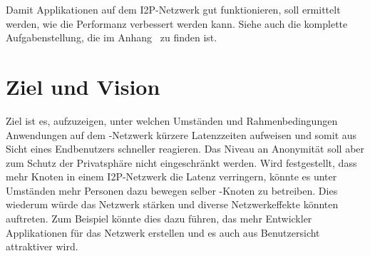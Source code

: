 Damit Applikationen auf dem I2P-Netzwerk gut funktionieren, soll ermittelt werden, wie die Performanz
verbessert werden kann.
Siehe auch die komplette Aufgabenstellung, die im Anhang~ zu finden ist.

\section{Ziel und Vision}\label{sec:ziel}

Ziel ist es, aufzuzeigen, unter welchen Umständen und Rahmenbedingungen Anwendungen auf dem -Netzwerk kürzere Latenzzeiten aufweisen
und somit aus Sicht eines Endbenutzers schneller reagieren.
Das Niveau an Anonymität soll aber zum Schutz der Privatsphäre nicht eingeschränkt werden.
Wird festgestellt, dass mehr Knoten in einem I2P-Netzwerk die Latenz verringern,
könnte es unter Umständen mehr Personen dazu bewegen selber -Knoten zu betreiben.
Dies wiederum würde das Netzwerk stärken und diverse Netzwerkeffekte könnten auftreten.
Zum Beispiel könnte dies dazu führen, das mehr Entwickler Applikationen für das Netzwerk erstellen und es auch aus Benutzersicht attraktiver wird.

